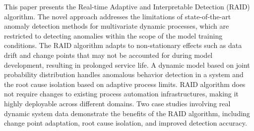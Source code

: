 This paper presents the Real-time Adaptive and Interpretable Detection (RAID) algorithm. The novel approach addresses the limitations of state-of-the-art anomaly detection methods for multivariate dynamic processes, which are restricted to detecting anomalies within the scope of the model training conditions. The RAID algorithm adapts to non-stationary effects such as data drift and change points that may not be accounted for during model development, resulting in prolonged service life. A dynamic model based on joint probability distribution handles anomalous behavior detection in a system and the root cause isolation based on adaptive process limits. RAID algorithm does not require changes to existing process automation infrastructures, making it highly deployable across different domains. Two case studies involving real dynamic system data demonstrate the benefits of the RAID algorithm, including change point adaptation, root cause isolation, and improved detection accuracy.